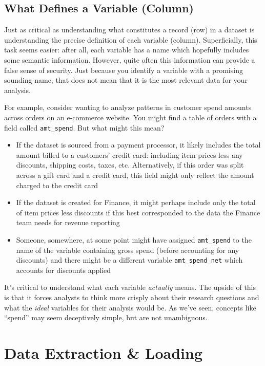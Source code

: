 \documentclass[
]{krantz}
\providecommand{\tightlist}{%
  \setlength{\itemsep}{0pt}\setlength{\parskip}{0pt}}
\begin{document}
\hypertarget{what-defines-a-variable-column}{%
\subsection{What Defines a Variable (Column)}\label{what-defines-a-variable-column}}

Just as critical as understanding what constitutes a record (row) in a dataset is understanding the precise definition of each variable (column).
Superficially, this task seems easier: after all, each variable has a name which hopefully includes some semantic information. However, quite often this information can provide a false sense of security.
Just because you identify a variable with a promising sounding name, that does not mean that it is the most relevant data for your analysis.

For example, consider wanting to analyze patterns in customer spend amounts across orders on an e-commerce website.
You might find a table of orders with a field called \texttt{amt\_spend}. But what might this mean?

\begin{itemize}
\tightlist
\item
  If the dataset is sourced from a payment processor, it likely includes the total amount billed to a customers' credit card: including item prices less any discounts, shipping costs, taxes, etc. Alternatively, if this order was split across a gift card and a credit card, this field might only reflect the amount charged to the credit card
\item
  If the dataset is created for Finance, it might perhaps include only the total of item prices less discounts if this best corresponded to the data the Finance team needs for revenue reporting
\item
  Someone, somewhere, at some point might have assigned \texttt{amt\_spend} to the name of the variable containing gross spend (before accounting for any discounts) and there might be a different variable \texttt{amt\_spend\_net} which accounts for discounts applied
\end{itemize}

It's critical to understand what each variable \emph{actually} means.
The upside of this is that it forces analysts to think more crisply about their research questions and what the \emph{ideal} variables for their analysis would be.
As we've seen, concepts like ``spend'' may seem deceptively simple, but are not unambiguous.

\hypertarget{data-extraction-loading}{%
\section{Data Extraction \& Loading}\label{data-extraction-loading}}
\end{document}
